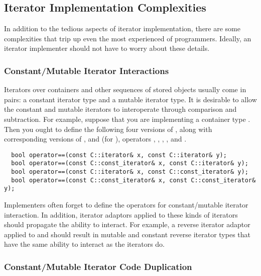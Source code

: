 \documentclass{netobjectdays}
\begin{document}
\subsection{Iterator Implementation Complexities}

In addition to the tedious aspects of iterator implementation, there
are some complexities that trip up even the most experienced of
programmers. Ideally, an iterator implementer should not have to worry
about these details.

\subsubsection{Constant/Mutable Iterator Interactions}
\label{sec:constant-mutable-iterations}

Iterators over containers and other sequences of stored objects
usually come in pairs: a constant iterator type and a mutable iterator
type. It is desirable to allow the constant and mutable iterators to
interoperate through comparison and
subtraction. For example, suppose
that you are implementing a container type . Then you ought to
define the following four versions of , along with
corresponding versions of , and (for
), operators \code{<}, \code{>},
\code{<=}, \code{>=}, and \code{-}.

{\footnotesize
\begin{verbatim}
  bool operator==(const C::iterator& x, const C::iterator& y);
  bool operator==(const C::const_iterator& x, const C::iterator& y);
  bool operator==(const C::iterator& x, const C::const_iterator& y);
  bool operator==(const C::const_iterator& x, const C::const_iterator& y);
\end{verbatim}
}

Implementers often forget to define the operators for constant/mutable
iterator interaction. In addition, iterator adaptors applied to these
kinds of iterators should propagate the ability to interact. For
example, a reverse iterator adaptor applied to  and
 should result in mutable and constant reverse iterator types that
have the same ability to interact as the  iterators do.

\subsubsection{Constant/Mutable Iterator Code Duplication}
\end{document}
